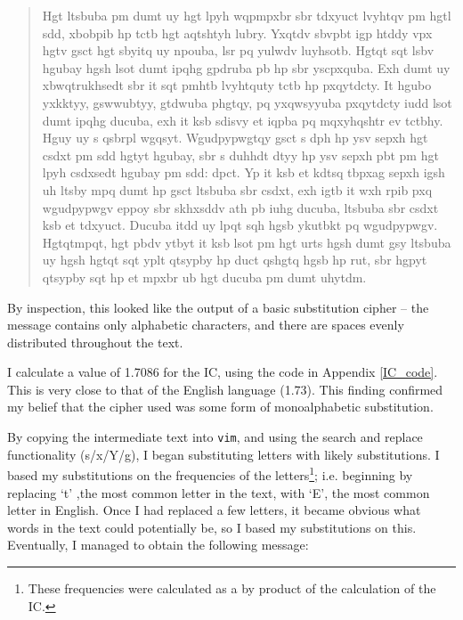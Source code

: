 \documentclass[11pt,a4paper,twoside]{article}
\begin{document}
\begin{quote}
\small
\raggedright
Hgt ltsbuba pm dumt uy hgt lpyh wqpmpxbr sbr tdxyuct lvyhtqv pm hgtl sdd,
xbobpib hp tctb hgt aqtshtyh lubry.  Yxqtdv sbvpbt igp htddy vpx hgtv gsct hgt
sbyitq uy npouba, lsr pq yulwdv luyhsotb.  Hgtqt sqt lsbv hgubay hgsh lsot dumt
ipqhg gpdruba pb hp sbr yscpxquba. Exh dumt uy xbwqtrukhsedt sbr it sqt pmhtb
lvyhtquty tctb hp pxqytdcty.  It hgubo yxkktyy, gswwubtyy, gtdwuba phgtqy, pq
yxqwsyyuba pxqytdcty iudd lsot dumt ipqhg ducuba, exh it ksb sdisvy et iqpba pq
mqxyhqshtr ev tctbhy. Hguy uy s qsbrpl wgqsyt.  Wgudpypwgtqy gsct s dph hp ysv
sepxh hgt csdxt pm sdd hgtyt hgubay, sbr s duhhdt dtyy hp ysv sepxh pbt pm hgt
lpyh csdxsedt hgubay pm sdd: dpct. Yp it ksb et kdtsq tbpxag sepxh igsh uh
ltsby mpq dumt hp gsct ltsbuba sbr csdxt, exh igtb it wxh rpib pxq wgudpypwgv
eppoy sbr skhxsddv ath pb iuhg ducuba, ltsbuba sbr csdxt ksb et tdxyuct. Ducuba
itdd uy lpqt sqh hgsb ykutbkt pq wgudpypwgv.  Hgtqtmpqt,  hgt pbdv ytbyt it ksb
lsot pm hgt urts hgsh dumt gsy ltsbuba uy hgsh hgtqt sqt yplt qtsypby hp duct
qshgtq hgsb hp rut, sbr hgpyt qtsypby sqt hp et mpxbr ub hgt ducuba pm dumt
uhytdm.
\end{quote}

By inspection, this looked like the output of a basic substitution cipher --
the message contains only alphabetic characters, and there are spaces evenly
distributed throughout the text.

I calculate a value of 1.7086 for the IC, using the code in Appendix
\ref{IC_code}.  This is very close to that of the English language (1.73). This
finding confirmed my belief that the cipher used was some form of
monoalphabetic substitution.  

By copying the intermediate text into {\tt vim}, and using the search and
replace functionality (s/x/Y/g), I began substituting letters with likely
substitutions. I based my substitutions on the frequencies of the
letters\footnote{These frequencies were calculated as a by product of the
calculation of the IC. }; i.e. beginning by replacing `t' ,the most common
letter in the text, with `E', the most common letter in English. Once I had
replaced a few letters, it became obvious what words in the text could
potentially be, so I based my substitutions on this. Eventually, I managed to
obtain the following message: 
\end{document}
